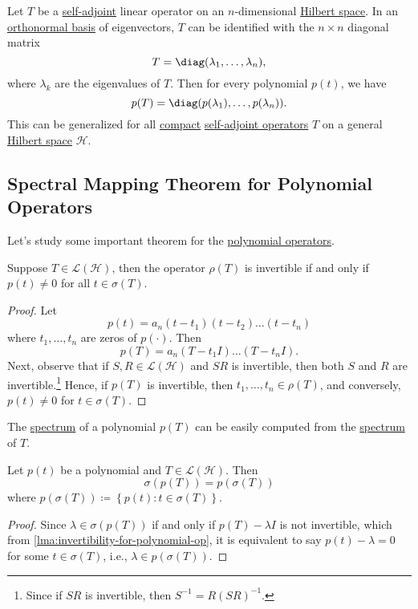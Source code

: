 \begin{eg}
	Let \(T\) be a \hyperref[def:self-adjoint-op]{self-adjoint} linear operator on an \(n\)-dimensional \hyperref[def:Hilbert-space]{Hilbert space}. In an \hyperref[def:orthonormal-basis]{orthonormal basis} of eigenvectors, \(T\) can be identified with the \(n \times n\) diagonal matrix
	\[
		T = \diag (\lambda _1, \ldots , \lambda _n),
	\]
	where \(\lambda _k\) are the eigenvalues of \(T\). Then for every polynomial \(p(t)\), we have
	\[
		p(T) = \diag (p(\lambda _1), \ldots  , p(\lambda _n)).
	\]
	This can be generalized for all \hyperref[def:compact-op]{compact} \hyperref[def:self-adjoint-op]{self-adjoint operators} \(T\) on a general \hyperref[def:Hilbert-space]{Hilbert space} \(\mathcal{H} \).
\end{eg}

\subsection{Spectral Mapping Theorem for Polynomial Operators}
Let's study some important theorem for the \hyperref[def:polynomial-op]{polynomial operators}.

\begin{lemma}\label{lma:invertibility-for-polynomial-op}
	Suppose \(T\in \mathcal{L} (\mathcal{H} )\), then the operator \(\rho (T)\) is invertible if and only if \(p(t) \neq 0\) for all \(t\in \sigma (T)\).
\end{lemma}
\begin{proof}
	Let
	\[
		p(t) = a_n (t-t_1)(t-t_2)\ldots  (t-t_n)
	\]
	where \(t_1, \ldots  , t_n\) are zeros of \(p(\cdot)\). Then
	\[
		p(T) = a_n (T-t_1 I)\ldots  (T-t_n I).
	\]
	Next, observe that if \(S, R\in \mathcal{L} (\mathcal{H} )\) and \(SR\) is invertible, then both \(S\) and \(R\) are invertible.\footnote{Since if \(SR\) is invertible, then \(S^{-1} = R(SR)^{-1} \).} Hence, if \(p(T)\) is invertible, then \(t_1, \ldots  , t_n\in \rho (T)\), and conversely, \(p(t) \neq 0\) for \(t\in \sigma (T)\).
\end{proof}

The \hyperref[def:spectrum-point]{spectrum} of a polynomial \(p(T)\) can be easily computed from the \hyperref[def:spectrum-point]{spectrum} of \(T\).

\begin{theorem}\label{thm:spectral-mapping-for-polynomial-op}
	Let \(p(t)\) be a polynomial and \(T\in \mathcal{L} (\mathcal{H} )\). Then
	\[
		\sigma (p(T)) = p(\sigma (T))
	\]
	where \(p(\sigma (T)) \coloneqq \left\{ p(t) \colon t\in \sigma (T) \right\} \).
\end{theorem}
\begin{proof}
	Since \(\lambda \in \sigma (p(T))\) if and only if \(p(T) - \lambda I\) is not invertible, which from \autoref{lma:invertibility-for-polynomial-op}, it is equivalent to say \(p(t) - \lambda = 0\) for some \(t\in \sigma (T)\), i.e., \(\lambda \in p(\sigma (T))\).
\end{proof}

